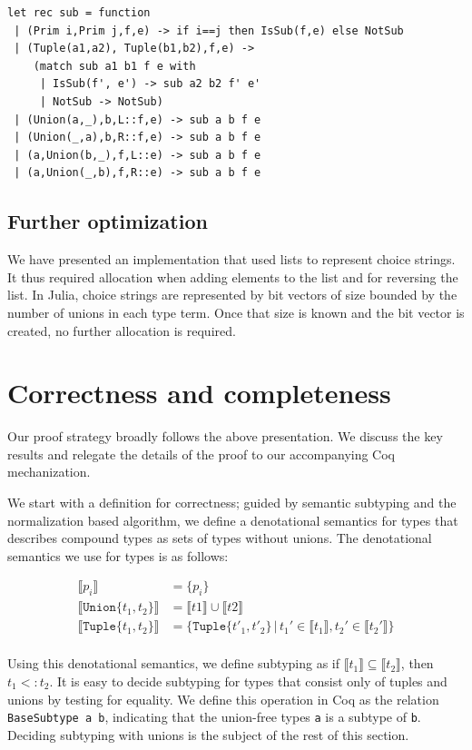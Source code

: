 \documentclass[a4paper,english]{lipics-v2019}
\newcommand{\xt}[1]{\texttt{#1}}
\newcommand{\tuplet}[2]{\xt{Tuple\{}#1,#2\xt{\}}}
\newcommand{\union}[2]{\xt{Union\{}#1,#2\xt{\}}}
\newcommand{\denotes}[1]{\llbracket #1 \rrbracket}
\begin{document}
\begin{lstlisting}
let rec sub = function
 | (Prim i,Prim j,f,e) -> if i==j then IsSub(f,e) else NotSub
 | (Tuple(a1,a2), Tuple(b1,b2),f,e) ->
    (match sub a1 b1 f e with
     | IsSub(f', e') -> sub a2 b2 f' e'
     | NotSub -> NotSub)
 | (Union(a,_),b,L::f,e) -> sub a b f e
 | (Union(_,a),b,R::f,e) -> sub a b f e
 | (a,Union(b,_),f,L::e) -> sub a b f e
 | (a,Union(_,b),f,R::e) -> sub a b f e
\end{lstlisting}

\subsection{Further optimization}

We have presented an implementation that used lists to represent choice
strings. It thus required allocation when adding elements to the list and
for reversing the list. In Julia, choice strings are represented by bit
vectors of size bounded by the number of unions in each type term.  Once
that size is known and the bit vector is created, no further allocation is
required.

\section{Correctness and completeness}

Our proof strategy broadly follows the above presentation.  We discuss the
key results and relegate the details of the proof to our accompanying Coq
mechanization. 

We start with a definition for correctness; guided by semantic subtyping and
the normalization based algorithm, we define a denotational semantics for
types that describes compound types as sets of types without unions.  The
denotational semantics we use for types is as follows:

\vspace{-3mm}
\begin{align*}
\denotes{p_i} &= \{p_i\} \\
\denotes{\union{t_1}{t_2}} &= \denotes{t1} \cup \denotes{t2} \\
\denotes{\tuplet{t_1}{t_2}} &= \{\tuplet{t'_1}{t'_2} \,|\, t_1' \in \denotes{t_1},  t_2' \in \denotes{t_2'}\} \\
\end{align*}
\vspace{-3mm}

Using this denotational semantics, we define subtyping as if $\denotes{t_1}
\subseteq \denotes{t_2}$, then $t_1 <: t_2$. It is easy to decide subtyping
for types that consist only of tuples and unions by testing for equality. We
define this operation in Coq as the relation \verb|BaseSubtype a b|,
indicating that the union-free types \verb|a| is a subtype of \verb|b|.
Deciding subtyping with unions is the subject of the rest of this section.
\end{document}
